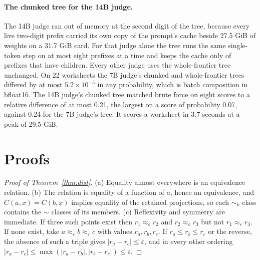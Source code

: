 \documentclass{article}
\theoremstyle{definition}
\theoremstyle{remark}
\begin{document}
\paragraph{The chunked tree for the 14B judge.}
The 14B judge ran out of memory at the second digit of the tree, because every live two-digit prefix carried its own copy of the prompt's cache beside 27.5 GiB of weights on a 31.7 GiB card.
For that judge alone the tree runs the same single-token step on at most eight prefixes at a time and keeps the cache only of prefixes that have children.
Every other judge uses the whole-frontier tree unchanged.
On 22 worksheets the 7B judge's chunked and whole-frontier trees differed by at most $5.2\times10^{-5}$ in any probability, which is batch composition in bfloat16.
The 14B judge's chunked tree matched brute force on eight scores to a relative difference of at most 0.21, the largest on a score of probability 0.07, against 0.24 for the 7B judge's tree.
It scores a worksheet in 3.7 seconds at a peak of 29.5 GiB.


\section{Proofs}
\label{app:proofs}

\begin{proof}[Proof of Theorem~\ref{thm:dist}]
(a) Equality almost everywhere is an equivalence relation.
(b) The relation is equality of a function of $a$, hence an equivalence, and $C(a,x)=C(b,x)$ implies equality of the retained projections, so each $\sim_{k}$ class contains the $\sim$ classes of its members.
(c) Reflexivity and symmetry are immediate.
If three such points exist then $r_{1}\approx_{\varepsilon}r_{2}$ and $r_{2}\approx_{\varepsilon}r_{3}$ but not $r_{1}\approx_{\varepsilon}r_{3}$.
If none exist, take $a\approx_{\varepsilon}b\approx_{\varepsilon}c$ with values $r_{a},r_{b},r_{c}$.
If $r_{a}\le r_{b}\le r_{c}$ or the reverse, the absence of such a triple gives $|r_{a}-r_{c}|\le\varepsilon$, and in every other ordering $|r_{a}-r_{c}|\le\max(|r_{a}-r_{b}|,|r_{b}-r_{c}|)\le\varepsilon$.
\end{proof}
\end{document}
